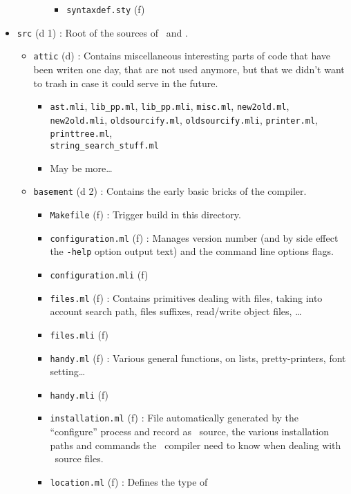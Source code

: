 \begin{itemize}
\begin{itemize}
\begin{itemize}
\begin{itemize}
      \item {\tt syntaxdef.sty} (f)
      \end{itemize}
    \end{itemize}
  \end{itemize}
\item {\tt src} (d 1) : Root of the sources of \focalizec\ and \focalizedep.
  \begin{itemize}
  \item {\tt attic} (d) : Contains miscellaneous interesting parts of
    code that have been writen one day, that are not used anymore, but
    that we didn't want to trash in case it could serve in the future.
    \begin{itemize}
    \item {\tt ast.mli}, {\tt lib\_pp.ml}, {\tt lib\_pp.mli},
      {\tt misc.ml}, {\tt new2old.ml}, {\tt new2old.mli},
      {\tt oldsourcify.ml}, {\tt oldsourcify.mli},
      {\tt printer.ml}, {\tt printtree.ml},\\
      {\tt string\_search\_stuff.ml}
    \item May be more\ldots
    \end{itemize}
  \item {\tt basement} (d 2) : Contains the early basic bricks of the
    compiler.
    \begin{itemize}
    \item {\tt Makefile} (f) : Trigger build in this directory.
    \item {\tt configuration.ml} (f) : Manages version number (and
      by side effect the {\tt -help} option output text) and the
      command line options flags.
    \item {\tt configuration.mli} (f)
    \item {\tt files.ml} (f) : Contains primitives dealing with
      files, taking into account search path, files suffixes,
      read/write object files, \ldots
    \item {\tt files.mli} (f)
    \item {\tt handy.ml} (f) : Various general functions, on lists,
      pretty-printers, font setting\ldots
    \item {\tt handy.mli} (f)
    \item {\tt installation.ml} (f) : File automatically generated
      by the ``configure'' process and record as \ocaml\ source, the
      various installation paths and commands the \focalizec\
      compiler need to know when dealing with \focalize\ source
      files.
    \item {\tt location.ml} (f) : Defines the type of

\end{itemize}
\end{itemize}
\end{itemize}
